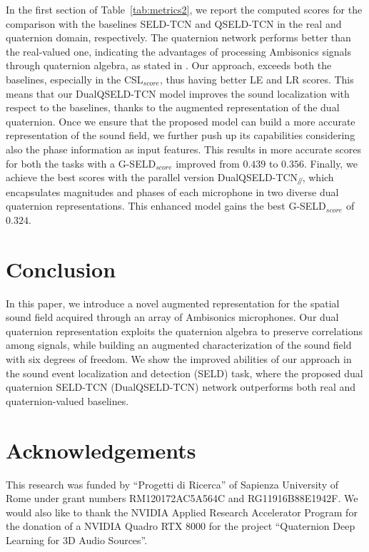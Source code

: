 \documentclass[3p, preprint, twocolumn]{elsarticle}
\newcommand{\parallelsum}{\mathbin{\!/\mkern-5mu/\!}}
\begin{document}
In the first section of Table~\ref{tab:metrics2}, we report the computed scores for the comparison with the baselines SELD-TCN and QSELD-TCN in the real and quaternion domain, respectively. The quaternion network performs better than the real-valued one, indicating the advantages of processing Ambisonics signals through quaternion algebra, as stated in \cite{Brignone2022ISCAS, ComminielloICASSP2019b, QSSL}. Our approach, exceeds both the baselines, especially in the CSL$_{score}$, thus having better LE and LR scores. This means that our DualQSELD-TCN model improves the sound localization with respect to the baselines, thanks to the augmented representation of the dual quaternion. Once we ensure that the proposed model can build a more accurate representation of the sound field, we further push up its capabilities considering also the phase information as input features. This results in more accurate scores for both the tasks with a G-SELD$_{score}$ improved from $0.439$ to $0.356$. Finally, we achieve the best scores with the parallel version DualQSELD-TCN$_{\parallelsum}$, which encapsulates magnitudes and phases of each microphone in two diverse dual quaternion representations. This enhanced model gains the best G-SELD$_{score}$ of $0.324$.






\section{Conclusion}
\label{sec:con}

In this paper, we introduce a novel augmented representation for the spatial sound field acquired through an array of Ambisonics microphones. Our dual quaternion representation exploits the quaternion algebra to preserve correlations among signals, while building an augmented characterization of the sound field with six degrees of freedom. We show the improved abilities of our approach in the sound event localization and detection (SELD) task, where the proposed dual quaternion SELD-TCN (DualQSELD-TCN) network outperforms both real and quaternion-valued baselines.

\section*{Acknowledgements}

This research was funded by ``Progetti di Ricerca'' of Sapienza University of Rome under grant numbers RM120172AC5A564C and RG11916B88E1942F. We would also like to thank the NVIDIA Applied Research Accelerator Program for the donation of a NVIDIA Quadro RTX 8000 for the project ``Quaternion Deep Learning for 3D Audio Sources''.
\end{document}
